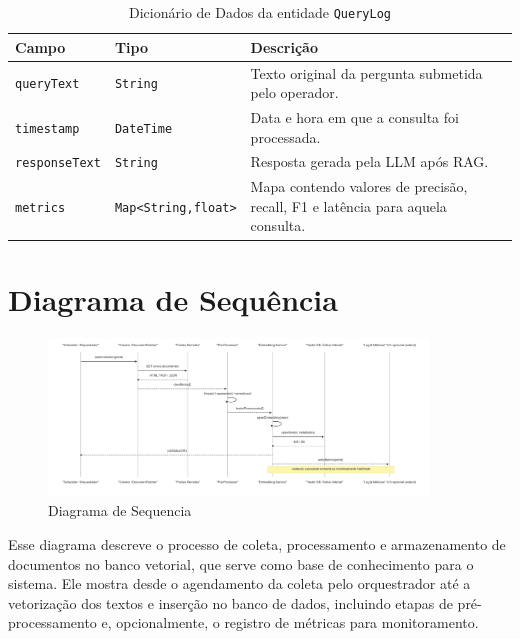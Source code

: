 \begin{description}
\begin{table}[H]
  \centering
  \caption{Dicionário de Dados da entidade \texttt{QueryLog}}
  \label{tab:dd_querylog}
  \begin{tabular}{|p{3cm}|p{4cm}|p{8cm}|}
    \hline
    \textbf{Campo}       & \textbf{Tipo}         & \textbf{Descrição} \\ \hline
    \texttt{queryText}    & \texttt{String}       & Texto original da pergunta submetida pelo operador. \\ \hline
    \texttt{timestamp}    & \texttt{DateTime}     & Data e hora em que a consulta foi processada. \\ \hline
    \texttt{responseText} & \texttt{String}       & Resposta gerada pela LLM após RAG. \\ \hline
    \texttt{metrics}      & \texttt{Map<String,float>} & Mapa contendo valores de precisão, recall, F1 e latência para aquela consulta. \\ \hline
  \end{tabular}
\end{table}

\section{Diagrama de Sequência}
\begin{figure}[H]
  \centering
  \includegraphics[width=0.9\textwidth]{latex-overleaf/04-figuras/sequencia-recuperacao-vetorizacao-dados.png}
  \caption{Diagrama de Sequencia}
  \label{fig:diagrama-sequencia}
\end{figure}

Esse diagrama descreve o processo de coleta, processamento e armazenamento de documentos no banco vetorial, que serve como base de conhecimento para o sistema. Ele mostra desde o agendamento da coleta pelo orquestrador até a vetorização dos textos e inserção no banco de dados, incluindo etapas de pré-processamento e, opcionalmente, o registro de métricas para monitoramento. 


\end{description}
